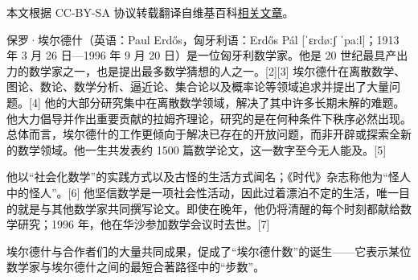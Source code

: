 
本文根据 CC-BY-SA 协议转载翻译自维基百科\href{https://en.wikipedia.org/wiki/Paul_Erd\%C5\%91s}{相关文章}。

保罗·埃尔德什（英语：Paul Erdős，匈牙利语：Erdős Pál [ˈɛrdøːʃ ˈpaːl]；1913 年 3 月 26 日—1996 年 9 月 20 日）是一位匈牙利数学家。他是 20 世纪最具产出力的数学家之一，也是提出最多数学猜想的人之一。[2][3] 埃尔德什在离散数学、图论、数论、数学分析、逼近论、集合论以及概率论等领域追求并提出了大量问题。[4] 他的大部分研究集中在离散数学领域，解决了其中许多长期未解的难题。他大力倡导并作出重要贡献的拉姆齐理论，研究的是在何种条件下秩序必然出现。总体而言，埃尔德什的工作更倾向于解决已存在的开放问题，而非开辟或探索全新的数学领域。他一生共发表约 1500 篇数学论文，这一数字至今无人能及。[5]

他以“社会化数学”的实践方式以及古怪的生活方式闻名；《时代》杂志称他为“怪人中的怪人”。[6] 他坚信数学是一项社会性活动，因此过着漂泊不定的生活，唯一目的就是与其他数学家共同撰写论文。即使在晚年，他仍将清醒的每个时刻都献给数学研究；1996 年，他在华沙参加数学会议时去世。[7]

埃尔德什与合作者们的大量共同成果，促成了“埃尔德什数”的诞生——它表示某位数学家与埃尔德什之间的最短合著路径中的“步数”。
